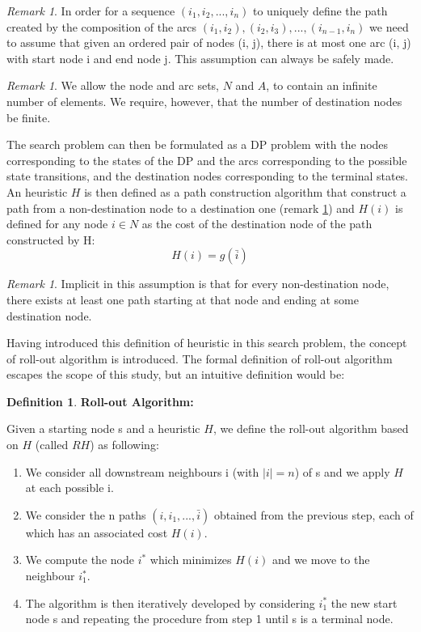 \documentclass[12,twoside]{TFG-GM}
\theoremstyle{definition}
\newtheorem{definition}[theorem]{Definition}
\theoremstyle{remark}
\newtheorem{remark}[theorem]{Remark}
\newcommand*\diff[1]{\bar{#1}}
\begin{document}
\begin{remark} \label{seq_ass}
In order for a sequence $(i_1, i_2,..., i_n)$ to uniquely define the path created by the composition of the arcs $(i_1, i_2), (i_2, i_3),...,(i_{n-1}, i_n)$ we need to assume that given an ordered pair of nodes (i, j), there is at most one arc (i, j) with start node i and end node j. This assumption can always be safely made. 
\end{remark}

\begin{remark} \label{why_terminal_costs}
We allow the node and arc sets, $N$ and $A$, to contain an infinite number of elements. We require, however, that the number of destination nodes be finite.
\end{remark}

The search problem can then be formulated as a DP problem with the nodes corresponding to the states of the DP and the arcs corresponding to the possible state transitions, and the destination nodes corresponding to the terminal states. An heuristic $H$ is then defined as a path construction algorithm that construct a path from a non-destination node to a destination one (remark \ref{path_exists}) and $H(i)$ is defined for any node $i \in N$ as the cost of the destination node of the path constructed by H:
$$ H(i) = g(\diff{i}) $$

\begin{remark} \label{path_exists}
Implicit in this assumption is that for every non-destination node, there exists at least one path starting at that node and ending at some destination node.
\end{remark}

Having introduced this definition of heuristic in this search problem, the concept of roll-out algorithm is introduced. The formal definition of roll-out algorithm escapes the scope of this study, but an intuitive definition would be:
\begin{definition} \textbf{Roll-out Algorithm:}

Given a starting node s and a heuristic $H$, we define the roll-out algorithm based on $H$ (called $RH$) as following: 
\begin{enumerate}
\item We consider all downstream neighbours i (with $|i| = n$) of s and we apply $H$ at each possible i.
\item We consider the n paths $(i, i_1, ..., \diff{i})$ obtained from the previous step, each of which has an associated cost $H(i)$.
\item We compute the node $i^*$ which minimizes $H(i)$ and we move to the neighbour $i_1^*$.
\item The algorithm is then iteratively developed by considering $i_1^*$ the new start node s and repeating the procedure from step 1 until s is a terminal node.
\end{enumerate}
   
\end{definition}
\end{document}
